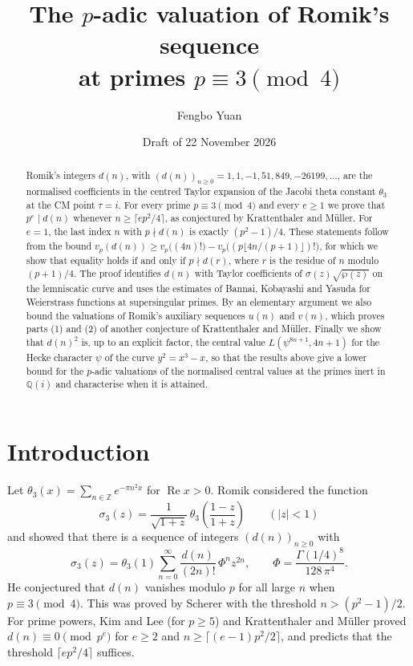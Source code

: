 \documentclass[11pt]{amsart}
\title[Valuations of Romik's sequence]{The $p$-adic valuation of Romik's sequence\\ at primes $p\equiv 3 \pmod 4$}
\author{Fengbo Yuan}
\date{Draft of 22 November 2026}
\theoremstyle{definition}
\theoremstyle{remark}
\newcommand{\Z}{\mathbb{Z}}
\newcommand{\Q}{\mathbb{Q}}
\begin{document}
\begin{abstract}
Romik's integers $d(n)$, with $(d(n))_{n\ge 0}=1,1,-1,51,849,-26199,\dots$, are the normalised
coefficients in the centred Taylor expansion of the Jacobi theta constant $\theta_3$ at the CM
point $\tau=i$. For every prime $p\equiv 3\pmod 4$ and every $e\ge1$ we prove that $p^e\mid d(n)$
whenever $n\ge \lceil ep^2/4\rceil$, as conjectured by Krattenthaler and M\"uller. For $e=1$, the
last index $n$ with $p\nmid d(n)$ is exactly $(p^2-1)/4$. These statements follow from the bound
$v_p(d(n))\ge v_p\bigl((4n)!\bigr)-v_p\bigl((p\lfloor 4n/(p+1)\rfloor)!\bigr)$, for which we show
that equality holds if and only if $p\nmid d(r)$, where $r$ is the residue of $n$ modulo
$(p+1)/4$. The proof identifies $d(n)$ with
Taylor coefficients of $\sigma(z)\sqrt{\wp(z)}$ on the lemniscatic curve and uses the estimates of
Bannai, Kobayashi and Yasuda for Weierstrass functions at supersingular primes. By an elementary argument we also bound the valuations of Romik's auxiliary
sequences $u(n)$ and $v(n)$, which proves parts (1) and (2) of another conjecture of Krattenthaler
and M\"uller. Finally we show that $d(n)^2$ is, up to an explicit factor, the central value
$L(\psi^{8n+1},4n+1)$ for the Hecke character $\psi$ of the curve $y^2=x^3-x$, so that the results
above give a lower bound for the $p$-adic valuations of the normalised central values at the primes
inert in $\Q(i)$ and characterise when it is attained.
\end{abstract}

\maketitle

\section{Introduction}

Let $\theta_3(x)=\sum_{n\in\Z}e^{-\pi n^2x}$ for $\operatorname{Re}x>0$. Romik \cite{Romik}
considered the function
\[
\sigma_3(z)=\frac{1}{\sqrt{1+z}}\,\theta_3\!\left(\frac{1-z}{1+z}\right)\qquad(|z|<1)
\]
and showed that there is a sequence of integers $(d(n))_{n\ge0}$ with
\begin{equation}\label{eq:romik}
\sigma_3(z)=\theta_3(1)\sum_{n=0}^{\infty}\frac{d(n)}{(2n)!}\,\Phi^n z^{2n},
\qquad \Phi=\frac{\Gamma(1/4)^8}{128\,\pi^4}.
\end{equation}
He conjectured that $d(n)$ vanishes modulo $p$ for all large $n$ when $p\equiv3\pmod4$. This was
proved by Scherer \cite{Scherer} with the threshold $n>(p^2-1)/2$. For prime powers,
Kim and Lee \cite{KimLee} (for $p\ge5$) and Krattenthaler and M\"uller \cite{KM} proved
$d(n)\equiv0\pmod{p^e}$ for $e\ge2$ and $n\ge\lceil (e-1)p^2/2\rceil$, and
\cite[Conjecture~45]{KM} predicts that the threshold $\lceil ep^2/4\rceil$ suffices.
\end{document}
